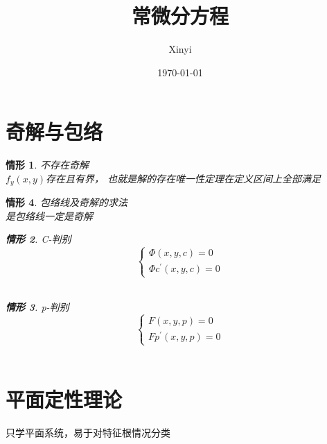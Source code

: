 \documentclass[12pt, a4paper]{article}
\newtheorem{case}{情形}[section]
\begin{document}
\title{常微分方程}
\author{Xinyi}
\date{\today}
\maketitle

\section{奇解与包络}
\begin{case}不存在奇解  \\
    $ f_y(x, y)$存在且有界，
    也就是解的存在唯一性定理在定义区间上全部满足
\end{case}

\begin{case} 包络线及奇解的求法\\
    是包络线一定是奇解\\
    \begin{case} 
        C-判别
        $$
        \left\{
            \begin{array}{l}
        \Phi(x, y, c)=0 \\
        \Phi c^{\prime}(x, y, c)=0
        \end{array}
        \right.
        $$\\    
    \end{case}
    \begin{case} 
        p-判别  
        $$
        \left\{
            \begin{array}{l}
        F(x, y, p)=0 \\
        Fp^{\prime}(x, y, p)=0
        \end{array}
        \right.
        $$\\
    \end{case}
\end{case}

\section{平面定性理论}
只学平面系统，易于对特征根情况分类
\end{document}
